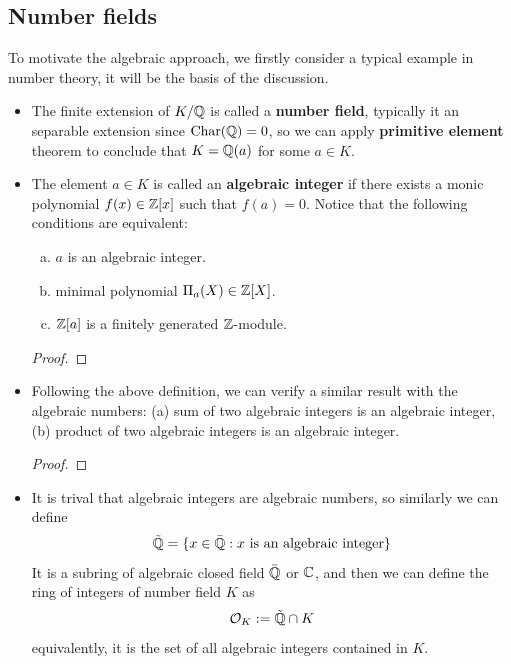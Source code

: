 \subsection{Number fields}

To motivate the algebraic approach, we firstly consider a typical example in number theory, it will be the basis of the discussion.

\begin{itemize}
    \item The finite extension of \(K/\mathbb{Q}\) is called a \textbf{number field}, typically it an separable extension since \(\mathrm{Char}(\mathbb{Q}) = 0\), so we can apply \textbf{primitive element} theorem to conclude that \(K = \mathbb{Q}(a)\) for some \(a \in K\).
    \item The element \(a \in K\) is called an \textbf{algebraic integer} if there exists a monic polynomial \(f(x) \in \mathbb{Z}[x]\) such that \(f(a) = 0\). Notice that the following conditions are equivalent:
    \begin{enumerate} [(a)]
        \item \(a\) is an algebraic integer.
        \item minimal polynomial \(\Pi_a(X) \in \mathbb{Z}[X]\).
        \item \(\mathbb{Z}[a]\) is a finitely generated \(\mathbb{Z}\)-module.
    \end{enumerate}
    \begin{proof}
        
    \end{proof}

    \item Following the above definition, we can verify a similar result with the algebraic numbers: (a) sum of two algebraic integers is an algebraic integer, (b) product of two algebraic integers is an algebraic integer.
    \begin{proof}
        
    \end{proof}
    \item It is trival that algebraic integers are algebraic numbers, so similarly we can define
    \[\tilde{\mathbb{Q}} = \{x \in \bar{\mathbb{Q}} : x \text{ is an algebraic integer}\}\]
    It is a subring of algebraic closed field \(\bar{\mathbb{Q}}\) or \(\mathbb{C}\), and then we can define the ring of integers of number field \(K\) as 
    \[\mathcal{O}_K := \tilde{\mathbb{Q}} \cap K\]
    equivalently, it is the set of all algebraic integers contained in \(K\). 
\end{itemize}

